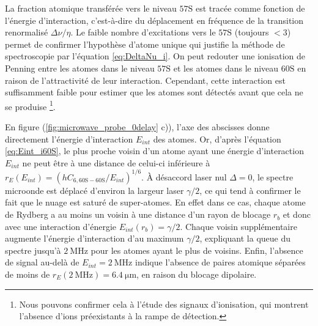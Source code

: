%
La fraction atomique transférée vers le niveau $\mathrm{57S}$ est tracée comme fonction de l'énergie d'interaction, c'est-à-dire du déplacement en fréquence de la transition renormalisé $\Delta\nu/\eta$.
Le faible nombre d'excitations vers le $\mathrm{57S}$ (toujours $<3$) permet de confirmer l'hypothèse d'atome unique qui justifie la méthode de spectroscopie par l'équation \eqref{eq:DeltaNu_i}.
On peut redouter une ionisation de Penning entre les atomes dans le niveau $\mathrm{57S}$ et les atomes dans le niveau $\mathrm{60S}$ en raison de l'attractivité de leur interaction.
Cependant, cette interaction est suffisamment faible pour estimer que les atomes sont détectés avant que cela ne se produise \footnote{
Nous pouvons confirmer cela à l'étude des signaux d'ionisation, qui montrent l'absence d'ions préexistants à la rampe de détection.}.

En figure (\ref{fig:microwave_probe_0delay} c)), l'axe des abscisses donne directement l'énergie d'interaction $E_{int}$ des atomes.
Or, d'après l'équation \eqref{eq:Eint_i60S}, le plus proche voisin d'un atome ayant une énergie d'interaction $E_{int}$ ne peut être à une distance de celui-ci inférieure à $r_E(E_{int}) = (hC_{6,\mathrm{60S-60S}}/E_{int})^{1/6}$.
\`A désaccord laser nul $\Delta = 0$, le spectre microonde est déplacé d'environ la largeur laser $\gamma/2$, ce qui tend à confirmer le fait que le nuage est saturé de super-atomes.
En effet dans ce cas, chaque atome de Rydberg a au moins un voisin à une distance d'un rayon de blocage $r_b$ et donc avec une interaction d'énergie $E_{int}(r_b) = \gamma/2$.
Chaque voisin supplémentaire augmente l'énergie d'interaction d'au maximum $\gamma/2$, expliquant la queue du spectre jusqu'à $\SI{2}{\MHz}$ pour les atomes ayant le plus de voisins.
Enfin, l'absence de signal au-delà de $E_{int} = \SI{2}{\MHz}$ indique l'absence de paires atomique séparées de moins de $r_E(\SI{2}{\MHz}) = \SI{6.4}{\um}$, en raison du blocage dipolaire.
	
